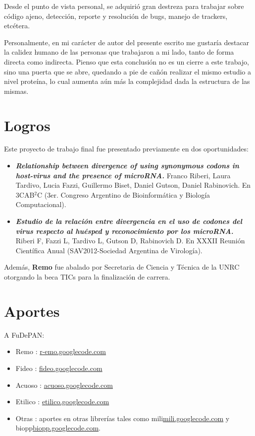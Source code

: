 \par Desde el punto de vista personal, se adquirió gran destreza para trabajar sobre código ajeno, detección, reporte y resolución de bugs, manejo de trackers, etcétera. 

\par Personalmente, en mi carácter de autor del presente escrito me gustaría destacar la calidez humano de las personas que trabajaron a mi lado, tanto de forma directa como indirecta. Pienso que esta conclusión no es un cierre a este trabajo, sino una puerta que se abre, quedando a pie de cañón realizar el mismo estudio a nivel proteína, lo cual aumenta aún más la complejidad dada la estructura de las mismas.

\section{Logros}
Este proyecto de trabajo final fue presentado previamente en dos oportunidades:
\begin{itemize}
    \item \emph{\textbf{Relationship between divergence of using synonymous codons in host-virus and the presence of microRNA.}} Franco	Riberi, Laura Tardivo, Lucia Fazzi, Guillermo Biset, Daniel Gutson, Daniel Rabinovich. En 3CAB$^{2}$C (3er. Congreso Argentino de Bioinformática y Biología Computacional).

    \item \emph{\textbf{Estudio de la relación entre divergencia  en el uso de codones del virus respecto al huésped y reconocimiento por los microRNA.}} Riberi F, Fazzi L, Tardivo L, Gutson D, Rabinovich D. En XXXII Reunión Científica Anual (SAV2012-Sociedad Argentina de Virología).    
\end{itemize}

Además, \textbf{Remo} fue abalado por Secretaria de Ciencia y Técnica de la UNRC otorgando la beca TICs para la finalización de carrera.

\section{Aportes}
\par A FuDePAN:
\begin{itemize}
    \item Remo   : \url{r-emo.googlecode.com}
    \item Fideo   : \url{fideo.googlecode.com}
    \item Acuoso  : \url{acuoso.googlecode.com}
    \item Etilico : \url{etilico.googlecode.com}
    \item Otras   : aportes en otras librerías tales como mili\url{mili.googlecode.com} y biopp\url{biopp.googlecode.com}.
\end{itemize}

